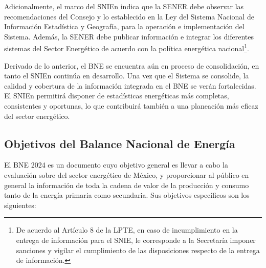 \documentclass{sener2025}
\begin{document}
Adicionalmente, el marco del SNIEn indica que la SENER debe observar las recomendaciones del Consejo y lo establecido en la Ley del Sistema Nacional de Información Estadística y Geografía, para la operación e implementación del Sistema. Además, la SENER debe publicar información e integrar los diferentes sistemas del Sector Energético de acuerdo con la política energética nacional\footnote{De acuerdo al Artículo 8 de la LPTE, en caso de incumplimiento en la entrega de información para el SNIE, le corresponde a la Secretaría imponer sanciones y vigilar el cumplimiento de las disposiciones respecto de la entrega de información.}.

Derivado de lo anterior, el BNE se encuentra aún en proceso de consolidación, en tanto el SNIEn continúa en desarrollo. Una vez que el Sistema se consolide, la calidad y cobertura de la información integrada en el BNE se verán fortalecidas. El SNIEn permitirá disponer de estadísticas energéticas más completas, consistentes y oportunas, lo que contribuirá también a una planeación más eficaz del sector energético.


\subsection{Objetivos del Balance Nacional de Energía}

El BNE 2024 es un documento cuyo objetivo general es llevar a cabo la evaluación sobre del sector energético de México, y proporcionar al público en general la información de toda la cadena de valor de la producción y consumo tanto de la energía primaria como secundaria. Sus objetivos específicos son los siguientes:
\end{document}
